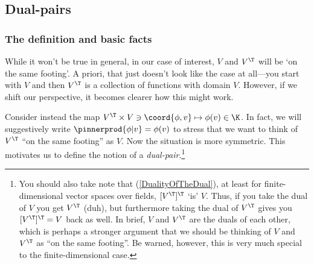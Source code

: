 \subsection{Dual-pairs}

\subsubsection{The definition and basic facts}

While it won't be true in general, in our case of interest, $V$ and $V^{\T}$ will be `on the same footing'.  A priori, that just doesn't look like the case at all---you start with $V$ and then $V^{\T}$ is a collection of functions with domain $V$.  However, if we shift our perspective, it becomes clearer how this might work.

Consider instead the map $V^{\T}\times V\ni \coord{\phi ,v}\mapsto \phi (v)\in \K$.  In fact, we will suggestively write $\pinnerprod{\phi |v}=\phi (v)$ to stress that we want to think of $V^{\T}$ ``on the same footing'' as $V$.  Now the situation is more symmetric.  This motivates us to define the notion of a \emph{dual-pair}.\footnote{You should also take note that (\cref{DualityOfTheDual}), at least for finite-dimensional vector spaces over fields, $[V^{\T}]^{\T}$ `is' $V$.  Thus, if you take the dual of $V$ you get $V^{\T}$ (duh), but furthermore taking the dual of $V^{\T}$ gives you $[V^{\T}]^{\T}=V$ back as well.  In brief, $V$ and $V^{\T}$ are the duals of each other, which is perhaps a stronger argument that we should be thinking of $V$ and $V^{\T}$ as ``on the same footing''.  Be warned, however, this is very much special to the finite-dimensional case.}
